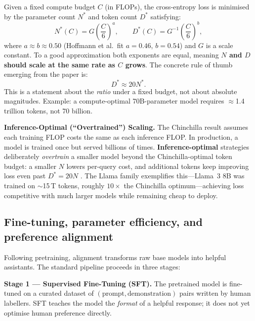 \documentclass[11pt,a4paper]{article}
\begin{document}
	\begin{keyconcept}
		Given a fixed compute budget $C$ (in FLOPs), the cross-entropy loss is minimised by the parameter count $N^*$ and token count $D^*$ satisfying:
		\begin{equation}\label{eq:chinchilla}
			N^*(C) = G\left(\frac{C}{6}\right)^{a}, \qquad D^*(C) = G^{-1}\left(\frac{C}{6}\right)^{b},
		\end{equation}
		where $a \approx b \approx 0.50$ (Hoffmann et al.\ fit $a{=}0.46$, $b{=}0.54$) and $G$ is a scale constant. To a good approximation both exponents are equal, meaning \textbf{$N$ and $D$ should scale at the same rate as $C$ grows}. The concrete rule of thumb emerging from the paper is:
		\begin{equation}
			D^* \approx 20 N^*.
		\end{equation}
		This is a statement about the \emph{ratio} under a fixed budget, not about absolute magnitudes. Example: a compute-optimal 70B-parameter model requires $\approx$1.4 trillion tokens, not 70 billion.
	\end{keyconcept}

	\textbf{Inference-Optimal (``Overtrained'') Scaling.} The Chinchilla result assumes each training FLOP costs the same as each inference FLOP. In production, a model is trained once but served billions of times. \textbf{Inference-optimal} strategies deliberately \emph{overtrain} a smaller model beyond the Chinchilla-optimal token budget: a smaller $N$ lowers per-query cost, and additional tokens keep improving loss even past $D^* = 20N$ \parencite{dubey2024}. The Llama family exemplifies this---Llama~3 8B was trained on $\sim$15\,T tokens, roughly $10{\times}$ the Chinchilla optimum---achieving loss competitive with much larger models while remaining cheap to deploy.

	\subsection{Fine-tuning, parameter efficiency, and preference alignment}

	Following pretraining, alignment transforms raw base models into helpful assistants. The standard pipeline proceeds in three stages:

	\textbf{Stage 1 --- Supervised Fine-Tuning (SFT).} The pretrained model is fine-tuned on a curated dataset of $(\text{prompt}, \text{demonstration})$ pairs written by human labellers. SFT teaches the model the \emph{format} of a helpful response; it does not yet optimise human preference directly.
\end{document}
